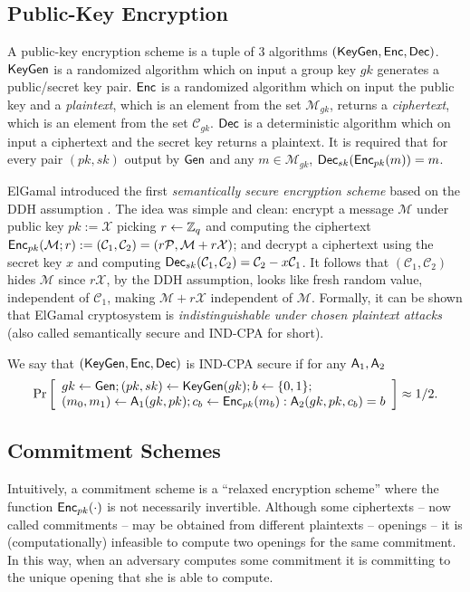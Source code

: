 \subsection{Public-Key Encryption}

A public-key encryption scheme is a tuple of 3 algorithms $(\mathsf{KeyGen},\mathsf{Enc},\mathsf{Dec})$. $\mathsf{KeyGen}$ is a randomized algorithm which on input a group key $gk$ generates a public/secret key pair. $\mathsf{Enc}$ is a randomized algorithm which on input the public key and a \emph{plaintext}, which is an element from the set $\mathcal{M}_{gk}$, returns a \emph{ciphertext}, which is an element from the set $\mathcal{C}_{gk}$. $\mathsf{Dec}$ is a deterministic algorithm which on input a ciphertext and the secret key returns a plaintext. It is required that for every pair $(pk,sk)$ output by $\mathsf{Gen}$ and any $m\in\mathcal{M}_{gk}$, $\mathsf{Dec}_{sk}(\mathsf{Enc}_{pk}(m))=m$.

ElGamal introduced the first \emph{semantically secure encryption scheme} based on the DDH assumption \cite{ElGamal85}. The idea was simple and clean: encrypt a message $\mathcal{M}$ under public key $pk:=\mathcal{X}$ picking $r\gets\mathbb{Z}_q$ and computing the ciphertext $\mathsf{Enc}_{pk}(\mathcal{M};r):=(\mathcal{C}_1,\mathcal{C}_2)=(r\mathcal{P},\mathcal{M}+r\mathcal{X})$; and decrypt a ciphertext using the secret key $x$ and computing $\mathsf{Dec}_{sk}(\mathcal{C}_1,\mathcal{C}_2)=\mathcal{C}_2-x\mathcal{C}_1$. It follows that $(\mathcal{C}_1,\mathcal{C}_2)$ hides $\mathcal{M}$ since $r\mathcal{X}$, by the DDH assumption, looks like fresh random value, independent of $\mathcal{C}_1$, making $\mathcal{M}+r\mathcal{X}$ independent of $\mathcal{M}$. Formally, it can be shown that ElGamal cryptosystem is \emph{indistinguishable under chosen plaintext attacks} (also called semantically secure and IND-CPA for short).

\begin{definition}
We say that $(\mathsf{KeyGen},\mathsf{Enc},\mathsf{Dec})$ is IND-CPA secure if for any $\mathsf{A}_1,\mathsf{A}_2$
$$
\Pr\left[\begin{array}{l}
gk\gets\mathsf{Gen};(pk,sk)\gets\mathsf{KeyGen}(gk);b\gets\{0,1\};\\
(m_0,m_1)\gets\mathsf{A}_1(gk,pk);
c_b\gets\mathsf{Enc}_{pk}(m_b):\mathsf{A}_2(gk,pk,c_b)=b
\end{array}\right]\approx 1/2.
$$
\end{definition}

\subsection{Commitment Schemes}
Intuitively, a commitment scheme is a ``relaxed encryption scheme'' where the function $\mathsf{Enc}_{pk}(\cdot)$  is not necessarily invertible. Although some ciphertexts -- now called commitments -- may be obtained from different plaintexts -- openings -- it is (computationally) infeasible to compute two openings for the same commitment. In this way, when an adversary computes some commitment it is committing to the unique opening that she is able to compute.
 
